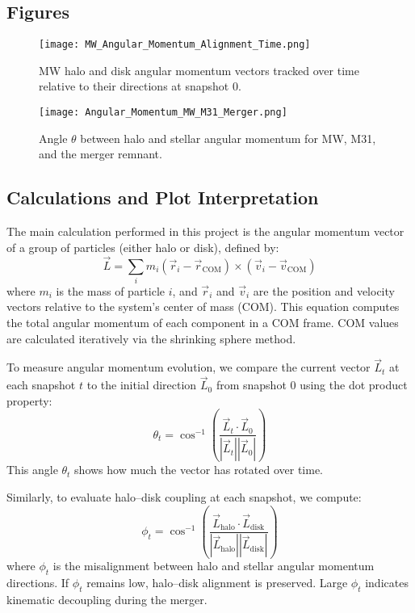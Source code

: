 \documentclass[twocolumn]{aastex631}
\begin{document}
\subsection{Figures}

\begin{figure}[ht!]
    \centering
    \texttt{[image: MW\_Angular\_Momentum\_Alignment\_Time.png]}
    \caption{MW halo and disk angular momentum vectors tracked over time relative to their directions at snapshot 0.}
    \label{fig:mw_vector_evolution}
\end{figure}

\begin{figure}[ht!]
    \centering
    \texttt{[image: Angular\_Momentum\_MW\_M31\_Merger.png]}
    \caption{Angle $\theta$ between halo and stellar angular momentum for MW, M31, and the merger remnant.}
    \label{fig:misalignment_plot}
\end{figure}

\subsection{Calculations and Plot Interpretation}

The main calculation performed in this project is the angular momentum vector of a group of particles (either halo or disk), defined by:
\[
\vec{L} = \sum_i m_i (\vec{r}_i - \vec{r}_{\text{COM}}) \times (\vec{v}_i - \vec{v}_{\text{COM}})
\]
where $m_i$ is the mass of particle $i$, and $\vec{r}_i$ and $\vec{v}_i$ are the position and velocity vectors relative to the system’s center of mass (COM). This equation computes the total angular momentum of each component in a COM frame. COM values are calculated iteratively via the shrinking sphere method.

To measure angular momentum evolution, we compare the current vector $\vec{L}_t$ at each snapshot $t$ to the initial direction $\vec{L}_0$ from snapshot 0 using the dot product property:
\[\theta_t = \cos^{-1}\left( \frac{ \vec{L}_t \cdot \vec{L}_0 }{ |\vec{L}_t||\vec{L}_0| } \right)\]
This angle $\theta_t$ shows how much the vector has rotated over time.

Similarly, to evaluate halo–disk coupling at each snapshot, we compute:
\[\phi_t = \cos^{-1}\left( \frac{ \vec{L}_\text{halo} \cdot \vec{L}_\text{disk} }{ |\vec{L}_\text{halo}||\vec{L}_\text{disk}| } \right)\]
where $\phi_t$ is the misalignment between halo and stellar angular momentum directions. If $\phi_t$ remains low, halo–disk alignment is preserved. Large $\phi_t$ indicates kinematic decoupling during the merger.
\end{document}
